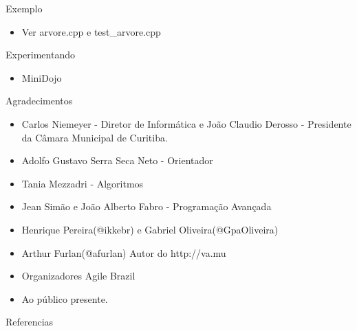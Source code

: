 \documentclass[10pt,a4paper]{beamer}
\begin{document}
	\begin{frame}{Exemplo}
		\begin{itemize}
			\item Ver arvore.cpp e test\_arvore.cpp
		\end{itemize}			
	\end{frame}  

	\begin{frame}{Experimentando}
		\begin{itemize}
			\item MiniDojo
		\end{itemize}
	\end{frame}  

	\begin{frame}{Agradecimentos}
		\begin{itemize}
			\item Carlos Niemeyer - Diretor de Informática e João Claudio Derosso - Presidente da Câmara Municipal de Curitiba.
			\pause
			\item Adolfo Gustavo Serra Seca Neto - Orientador
			\pause
			\item Tania Mezzadri - Algoritmos
			\pause
			\item Jean Simão e João Alberto Fabro - Programação Avançada
			\pause
			\item Henrique Pereira(@ikkebr) e Gabriel Oliveira(@GpaOliveira)
			\pause
			\item Arthur Furlan(@afurlan) Autor do http://va.mu
			\pause
			\item Organizadores Agile Brazil
			\pause
			\item Ao público presente.
		\end{itemize}
		
	\end{frame}  

  \begin{frame}[allowframebreaks]{Referencias} 
   	
  \end{frame}  
\end{document}
